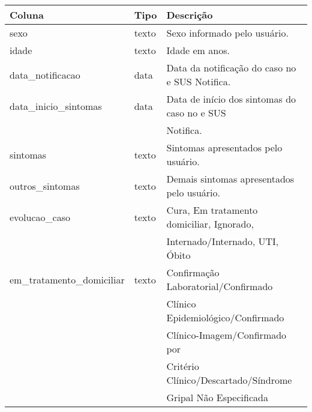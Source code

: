 \begin{table}[H]
  \centering

  \begin{tabular}{lll}
  \hline
  \multicolumn{1}{|l|}{\textbf{Coluna}} & \multicolumn{1}{l|}{\textbf{Tipo}} & \multicolumn{1}{l|}{\textbf{Descrição}}                                                                                                                         \\ \hline
  sexo                                  & texto                               & Sexo informado pelo usuário.                                                                                                                                    \\
  idade                                 & texto                               & Idade em anos.                                                                                                                                                  \\
  data\_notificacao                     & data                          & Data da notificação do caso no e SUS Notifica.                                                                                                                  \\
  data\_inicio\_sintomas                & data                          & Data de início dos sintomas do caso no e SUS\\ & & Notifica.                                                                                                          \\
  sintomas                              & texto                               & Sintomas apresentados pelo usuário.                                                                                                                             \\
  outros\_sintomas                      & texto                               & Demais sintomas apresentados pelo usuário.                                                                                                                      \\
  evolucao\_caso                        & texto                               & Cura, Em tratamento domiciliar, Ignorado, \\ & & Internado/Internado, UTI, Óbito                                                                                       \\
  em\_tratamento\_domiciliar            & texto                               & Confirmação Laboratorial/Confirmado \\ & & Clínico Epidemiológico/Confirmado \\ & & Clínico-Imagem/Confirmado por \\ & & Critério Clínico/Descartado/Síndrome \\ & & Gripal Não Especificada \\

\end{tabular}
\end{table}
